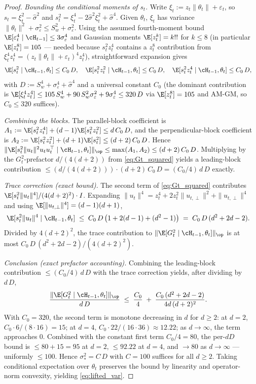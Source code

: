 \begin{proof}
\emph{Bounding the conditional moments of $s_t$.} Write
$\xi_t := z_t\|\theta_t\|+\varepsilon_t$, so $s_t = \xi_t^2-\hat\sigma^2$ and
$s_t^2 = \xi_t^4 - 2\hat\sigma^2\xi_t^2 + \hat\sigma^4$. Given
$\theta_t$, $\xi_t$ has variance $\|\theta_t\|^2+\sigma_\varepsilon^2\le S_w^2+\sigma_\varepsilon^2$.
Using the assumed fourth-moment bound $\E[\varepsilon_t^4\mid\cH_{t-1}]\le 3\sigma_\varepsilon^4$
and Gaussian moments $\E[z_t^k]=k!!$ for $k\le 8$ (in particular
$\E[z_t^8]=105$ — needed because $s_t^2 z_t^4$ contains a $z_t^8$
contribution from $\xi_t^4 z_t^4 = (z_t\|\theta_t\|+\varepsilon_t)^4 z_t^4$),
straightforward expansion gives
\[
\E[s_t^2\mid\cH_{t-1},\theta_t]\le C_0\,D,\quad
\E[s_t^2 z_t^2\mid\cH_{t-1},\theta_t]\le C_0\,D,\quad
\E[s_t^2 z_t^4\mid\cH_{t-1},\theta_t]\le C_0\,D,
\]
with $D := S_w^4+\sigma_\varepsilon^4+\hat\sigma^4$ and a universal
constant $C_0$ (the dominant contribution is
$\E[\xi_t^4 z_t^4]\le 105\,S_w^4 + 90\,S_w^2\sigma_\varepsilon^2+9\sigma_\varepsilon^4
\le 320\,D$ via $\E[z_t^8]=105$ and AM-GM, so $C_0\le 320$ suffices).

\emph{Combining the blocks.} The parallel-block coefficient is
$A_1 := \E[s_t^2 z_t^4]+(d-1)\E[s_t^2 z_t^2]\le d\,C_0\,D$, and the
perpendicular-block coefficient is
$A_2 := \E[s_t^2 z_t^2]+(d+1)\E[s_t^2]\le (d+2)\,C_0\,D$. Hence
$\|\E[s_t^2\|u_t\|^2 u_tu_t^\top\mid\cH_{t-1},\theta_t]\|_\op
\le \max(A_1,A_2)\le (d+2)\,C_0\,D$. Multiplying by the
$G_t^2$-prefactor $d/(4(d+2))$ from \eqref{eq:Gt_squared} yields a
leading-block contribution
$\le (d/(4(d+2)))\cdot (d+2)\,C_0\,D = (C_0/4)\,d\,D$ exactly.

\emph{Trace correction (exact bound).} The second term of
\eqref{eq:Gt_squared} contributes
$\E[s_t^2\|u_t\|^4]/(4(d+2)^2)\cdot I$. Expanding
$\|u_t\|^4 = z_t^4 + 2z_t^2\|u_{t,\perp}\|^2 + \|u_{t,\perp}\|^4$ and
using $\E[\|u_{t,\perp}\|^4]=(d-1)(d+1)$,
\[
\E[s_t^2\|u_t\|^4\mid\cH_{t-1},\theta_t]
\;\le\;C_0\,D\,\bigl(1+2(d-1)+(d^2-1)\bigr)
\;=\;C_0\,D\,(d^2+2d-2).
\]
Divided by $4(d+2)^2$, the trace contribution to
$\|\E[G_t^2\mid\cH_{t-1},\theta_t]\|_\op$ is at most
$C_0\,D\,(d^2+2d-2)/(4(d+2)^2)$.

\emph{Conclusion (exact prefactor accounting).} Combining the
leading-block contribution $\le (C_0/4)\,d\,D$ with the trace
correction yields, after dividing by $d\,D$,
\[
\frac{\|\E[G_t^2\mid\cH_{t-1},\theta_t]\|_\op}{d\,D}
\;\le\;\frac{C_0}{4}
\;+\;\frac{C_0\,(d^2+2d-2)}{4d\,(d+2)^2}.
\]
With $C_0=320$, the second term is monotone decreasing in $d$ for
$d\ge 2$: at $d=2$, $C_0\cdot 6/(8\cdot 16)=15$; at $d=4$,
$C_0\cdot 22/(16\cdot 36)\approx 12.22$; as $d\to\infty$, the term
approaches $0$. Combined with the constant first term $C_0/4=80$,
the per-$dD$ bound is $\le 80+15=95$ at $d=2$, $\le 92.22$ at $d=4$,
and $\to 80$ as $d\to\infty$ — uniformly $\le 100$. Hence
$\sigma_*^2 = C\,D$ with $C = 100$ suffices for all $d\ge 2$.
Taking conditional expectation over $\theta_t$ preserves the bound
by linearity and operator-norm convexity, yielding
\eqref{eq:lifted_var}.
\end{proof}

